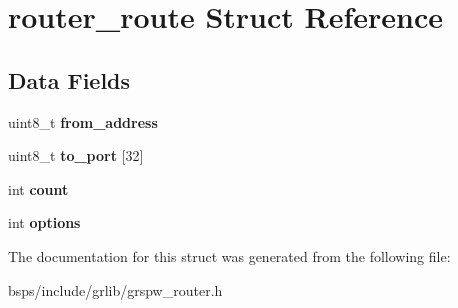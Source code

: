 \hypertarget{structrouter__route}{}\section{router\+\_\+route Struct Reference}
\label{structrouter__route}
\subsection*{Data Fields}
\begin{DoxyCompactItemize}
\item 
\mbox{\label{structrouter__route_a1f1deb1738f27b4ff07e09201c7074fb}} 
uint8\+\_\+t {\bfseries from\+\_\+address}
\item 
\mbox{\label{structrouter__route_a88ef21c8df218fecbe58f7d35c709cc5}} 
uint8\+\_\+t {\bfseries to\+\_\+port} \mbox{[}32\mbox{]}
\item 
\mbox{\label{structrouter__route_ab91b4d777e2d8d78ccfb223678234f8e}} 
int {\bfseries count}
\item 
\mbox{\label{structrouter__route_a619bca90f9a716f27f646e0991f0ac77}} 
int {\bfseries options}
\end{DoxyCompactItemize}


The documentation for this struct was generated from the following file\+:\begin{DoxyCompactItemize}
\item 
bsps/include/grlib/grspw\+\_\+router.\+h\end{DoxyCompactItemize}
